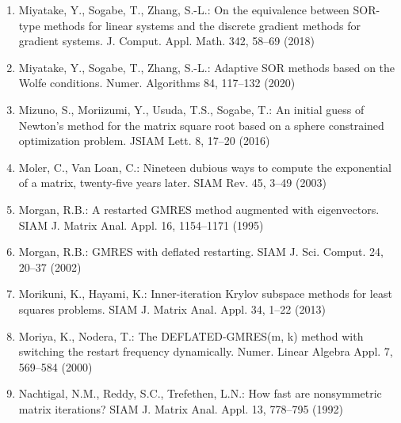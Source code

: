 \begin{enumerate}[label=\arabic*.,ref=\arabic*,leftmargin=3em]
\item\label{bib:source-130}Miyatake, Y., Sogabe, T., Zhang, S.-L.: On the equivalence between SOR-type methods for linear systems and the discrete gradient methods for gradient systems. J. Comput. Appl. Math. 342, 58–69 (2018)

\item\label{bib:source-131}Miyatake, Y., Sogabe, T., Zhang, S.-L.: Adaptive SOR methods based on the Wolfe conditions. Numer. Algorithms 84, 117–132 (2020)

\item\label{bib:source-132}Mizuno, S., Moriizumi, Y., Usuda, T.S., Sogabe, T.: An initial guess of Newton’s method for the matrix square root based on a sphere constrained optimization problem. JSIAM Lett. 8, 17–20 (2016)

\item\label{bib:source-133}Moler, C., Van Loan, C.: Nineteen dubious ways to compute the exponential of a matrix, twenty-five years later. SIAM Rev. 45, 3–49 (2003)

\item\label{bib:source-134}Morgan, R.B.: A restarted GMRES method augmented with eigenvectors. SIAM J. Matrix Anal. Appl. 16, 1154–1171 (1995)

\item\label{bib:source-135}Morgan, R.B.: GMRES with deflated restarting. SIAM J. Sci. Comput. 24, 20–37 (2002)

\item\label{bib:source-136}Morikuni, K., Hayami, K.: Inner-iteration Krylov subspace methods for least squares problems. SIAM J. Matrix Anal. Appl. 34, 1–22 (2013)

\item\label{bib:source-137}Moriya, K., Nodera, T.: The DEFLATED-GMRES(m, k) method with switching the restart frequency dynamically. Numer. Linear Algebra Appl. 7, 569–584 (2000)

\item\label{bib:source-138}Nachtigal, N.M., Reddy, S.C., Trefethen, L.N.: How fast are nonsymmetric matrix iterations? SIAM J. Matrix Anal. Appl. 13, 778–795 (1992)


\end{enumerate}

